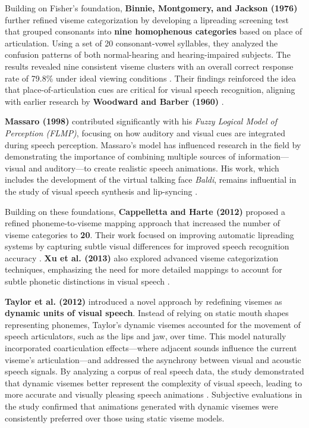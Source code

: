 \documentclass[12pt]{article}
\begin{document}
Building on Fisher’s foundation, \textbf{Binnie, Montgomery, and Jackson (1976)} further refined viseme categorization by developing a lipreading screening test that grouped consonants into \textbf{nine homophenous categories} based on place of articulation. Using a set of 20 consonant-vowel syllables, they analyzed the confusion patterns of both normal-hearing and hearing-impaired subjects. The results revealed nine consistent viseme clusters with an overall correct response rate of 79.8\% under ideal viewing conditions \cite{Binnie1976VisualRehabilitation}. Their findings reinforced the idea that place-of-articulation cues are critical for visual speech recognition, aligning with earlier research by \textbf{Woodward and Barber (1960)} \cite{WOODWARD1960PhonemeLipreading}.

\textbf{Massaro (1998)} contributed significantly with his \textit{Fuzzy Logical Model of Perception (FLMP)}, focusing on how auditory and visual cues are integrated during speech perception. Massaro's model has influenced research in the field by demonstrating the importance of combining multiple sources of information—visual and auditory—to create realistic speech animations. His work, which includes the development of the virtual talking face \textit{Baldi}, remains influential in the study of visual speech synthesis and lip-syncing \cite{Massaro1998PerceivingPrinciple}.

Building on these foundations, \textbf{Cappelletta and Harte (2012)} proposed a refined phoneme-to-viseme mapping approach that increased the number of viseme categories to \textbf{20}. Their work focused on improving automatic lipreading systems by capturing subtle visual differences for improved speech recognition accuracy \cite{Cappelletta2012Phoneme-to-visemeRecognition}. \textbf{Xu et al. (2013)} also explored advanced viseme categorization techniques, emphasizing the need for more detailed mappings to account for subtle phonetic distinctions in visual speech \cite{Xu213}.

\textbf{Taylor et al. (2012)} introduced a novel approach by redefining visemes as \textbf{dynamic units of visual speech}. Instead of relying on static mouth shapes representing phonemes, Taylor’s dynamic visemes accounted for the movement of speech articulators, such as the lips and jaw, over time. This model naturally incorporated coarticulation effects—where adjacent sounds influence the current viseme’s articulation—and addressed the asynchrony between visual and acoustic speech signals. By analyzing a corpus of real speech data, the study demonstrated that dynamic visemes better represent the complexity of visual speech, leading to more accurate and visually pleasing speech animations \cite{Taylor2012DynamicSpeech}. Subjective evaluations in the study confirmed that animations generated with dynamic visemes were consistently preferred over those using static viseme models.
\end{document}
